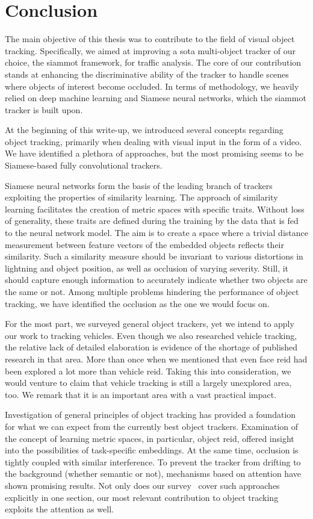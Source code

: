 \section{Conclusion}
\label{sec:Conclusion}

The main objective of this thesis was to contribute to the field of visual object tracking. Specifically, we aimed at improving a \gls{sota} multi-object tracker of our choice, the \gls{siammot} framework, for traffic analysis. The core of our contribution stands at enhancing the discriminative ability of the tracker to handle scenes where objects of interest become occluded. In terms of methodology, we heavily relied on deep machine learning and Siamese neural networks, which the \gls{siammot} tracker is built upon.

At the beginning of this write-up, we introduced several concepts regarding object tracking, primarily when dealing with visual input in the form of a video. We have identified a plethora of approaches, but the most promising seems to be Siamese-based fully convolutional trackers.

Siamese neural networks form the basis of the leading branch of trackers exploiting the properties of similarity learning. The approach of similarity learning facilitates the creation of metric spaces with specific traits. Without loss of generality, these traits are defined during the training by the data that is fed to the neural network model. The aim is to create a space where a trivial distance measurement between feature vectors of the embedded objects reflects their similarity. Such a similarity measure should be invariant to various distortions in lightning and object position, as well as occlusion of varying severity. Still, it should capture enough information to accurately indicate whether two objects are the same or not. Among multiple problems hindering the performance of object tracking, we have identified the occlusion as the one we would focus on.

For the most part, we surveyed general object trackers, yet we intend to apply our work to tracking vehicles. Even though we also researched vehicle tracking, the relative lack of detailed elaboration is evidence of the shortage of published research in that area. More than once when we mentioned that even face \gls{reid} had been explored a lot more than vehicle \gls{reid}. Taking this into consideration, we would venture to claim that vehicle tracking is still a largely unexplored area, too. We remark that it is an important area with a vast practical impact.

Investigation of general principles of object tracking has provided a foundation for what we can expect from the currently best object trackers. Examination of the concept of learning metric spaces, in particular, object \gls{reid}, offered insight into the possibilities of task-specific embeddings. At the same time, occlusion is tightly coupled with similar interference. To prevent the tracker from drifting to the background (whether semantic or not), mechanisms based on attention have shown promising results. Not only does our survey~\cite{ondrasovic2021siamese} cover such approaches explicitly in one section, our most relevant contribution to object tracking exploits the attention as well.
